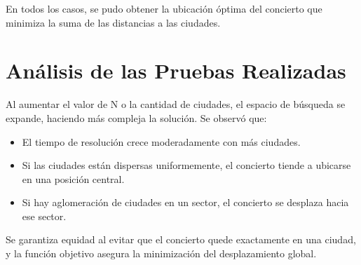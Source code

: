 \documentclass[conference]{IEEEtran}
\begin{document}
En todos los casos, se pudo obtener la ubicación óptima del concierto que
minimiza la suma de las distancias a las ciudades.

\section{Análisis de las Pruebas Realizadas}

Al aumentar el valor de N o la cantidad de ciudades, el espacio de
búsqueda se expande, haciendo más compleja la solución. Se observó que:

\begin{itemize}
	\item
	El tiempo de resolución crece moderadamente con más ciudades.
	\item
	Si las ciudades están dispersas uniformemente, el concierto tiende a
	ubicarse en una posición central.
	\item
	Si hay aglomeración de ciudades en un sector, el concierto se desplaza
	hacia ese sector.
\end{itemize}

Se garantiza equidad al evitar que el concierto quede exactamente en una
ciudad, y la función objetivo asegura la minimización del desplazamiento
global.
\end{document}
